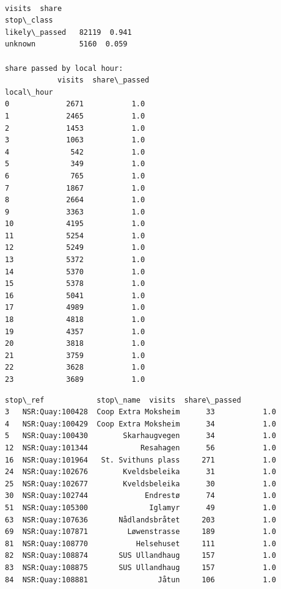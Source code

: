 \documentclass[11pt]{article}
\begin{document}
    \begin{center}
    \end{center}
    { \hspace*{\fill} \\}
    
    \begin{Verbatim}[commandchars=\\\{\}]
               visits  share
stop\_class
likely\_passed   82119  0.941
unknown          5160  0.059

share passed by local hour:
            visits  share\_passed
local\_hour
0             2671           1.0
1             2465           1.0
2             1453           1.0
3             1063           1.0
4              542           1.0
5              349           1.0
6              765           1.0
7             1867           1.0
8             2664           1.0
9             3363           1.0
10            4195           1.0
11            5254           1.0
12            5249           1.0
13            5372           1.0
14            5370           1.0
15            5378           1.0
16            5041           1.0
17            4989           1.0
18            4818           1.0
19            4357           1.0
20            3818           1.0
21            3759           1.0
22            3628           1.0
23            3689           1.0
    \end{Verbatim}

    
    \begin{Verbatim}[commandchars=\\\{\}]
           stop\_ref            stop\_name  visits  share\_passed
3   NSR:Quay:100428  Coop Extra Moksheim      33           1.0
4   NSR:Quay:100429  Coop Extra Moksheim      34           1.0
5   NSR:Quay:100430        Skarhaugvegen      34           1.0
12  NSR:Quay:101344            Resahagen      56           1.0
16  NSR:Quay:101964   St. Svithuns plass     271           1.0
24  NSR:Quay:102676        Kveldsbeleika      31           1.0
25  NSR:Quay:102677        Kveldsbeleika      30           1.0
30  NSR:Quay:102744             Endrestø      74           1.0
51  NSR:Quay:105300              Iglamyr      49           1.0
63  NSR:Quay:107636       Nådlandsbråtet     203           1.0
69  NSR:Quay:107871         Løwenstrasse     189           1.0
81  NSR:Quay:108770           Helsehuset     111           1.0
82  NSR:Quay:108874       SUS Ullandhaug     157           1.0
83  NSR:Quay:108875       SUS Ullandhaug     157           1.0
84  NSR:Quay:108881                Jåtun     106           1.0
    \end{Verbatim}
\end{document}
